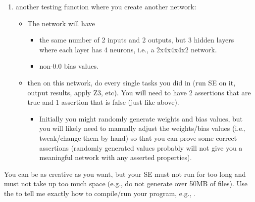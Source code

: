\begin{enumerate}
\begin{itemize}
    \item apply Z3 to the symbolic states to obtain
        \begin{itemize}
        \item random inputs and associated outputs
        \item simulate concrete execution
        \item checking the 3 assertions as shown
        \end{itemize}
    \end{itemize}
\item another testing function  where you create another network:
    \begin{itemize}
    \item The network will have 
        \begin{itemize}
        \item the same number of 2 inputs and 2 outputs, but 3 hidden layers where each layer  has 4  neurons, i.e., a 2x4x4x4x2 network.
        \item non-0.0 bias values.
        \end{itemize}
    \item then on this network, do every single tasks you did in   (run SE on it, output results, apply Z3, etc).  You will need to have 2 assertions that are true and 1 assertion that is false (just like above).
        \begin{itemize}
        \item Initially you might randomly generate weights and bias values, but you will likely need to manually adjust the weights/bias values (i.e., tweak/change them by hand) so that you can prove some correct assertions (randomly generated values probably will not give you a meaningful network with any asserted properties).
        \end{itemize}
    \end{itemize}
\end{enumerate}


You can be as creative as you want, but your SE must not run for too long and must not take up too much space (e.g., do not generate over 50MB of files).  Use the  to tell me exactly how to compile/run your program, e.g., .

